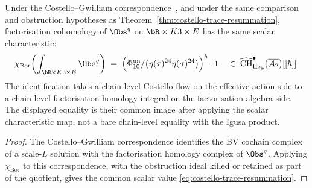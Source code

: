 \begin{corollary}
\label{cor:costello-trace-dual}
Under the Costello--Gwilliam correspondence~\cite[Theorem 10.2.1,
Vol.~1]{CostelloGwilliam2017}, and under the same comparison and
obstruction hypotheses as Theorem~\ref{thm:costello-trace-resummation},
factorisation cohomology of $\Obs^q$ on $\bR\times K3\times E$ has the
same scalar characteristic:
\begin{equation}\label{eq:costello-trace-dual}
 \chi_{\mathrm{Bor}}\!\left(
 \int_{\bR\times K3\times E}\Obs^q
 \right)
 \;=\;
 \Bigl(\Phi_{10}^{\mathrm{un}}/
 \bigl(\eta(\tau)^{24}\eta(\sigma)^{24}\bigr)\Bigr)^\hbar\cdot\mathbf{1}
 \quad
 \in\;
 \widehat{\mathrm{CH}}^\bullet_{\mathrm{Heg}}
 \bigl(\overline{\mathcal{A}_2}\bigr)[[\hbar]].
\end{equation}
The identification takes a chain-level Costello flow on the effective
action side to a chain-level factorisation homology integral on the
factorisation-algebra side. The displayed equality is their common
image after applying the scalar characteristic map, not a bare
chain-level equality with the Igusa product.
\end{corollary}

\begin{proof}
The Costello--Gwilliam correspondence identifies the BV cochain complex
of a scale-$L$ solution with the factorisation homology complex of
\(\Obs^q\). Applying \(\chi_{\mathrm{Bor}}\) to this correspondence,
with the obstruction ideal killed or retained as part of the quotient,
gives the common scalar value \eqref{eq:costello-trace-resummation}.
\end{proof}

